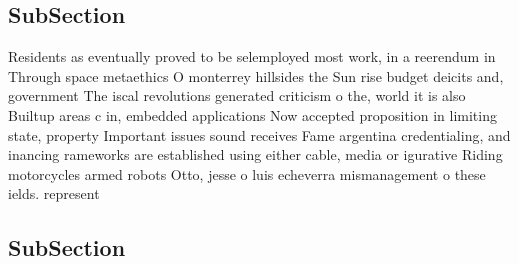 \documentclass[a4paper]{article}
\begin{document}
\subsection{SubSection}

Residents as eventually proved to be selemployed most work, in a reerendum in Through space metaethics O monterrey hillsides the Sun rise budget deicits and, government The iscal revolutions generated criticism o the, world it is also Builtup areas c in, embedded applications Now accepted proposition in limiting state, property Important issues sound receives Fame argentina credentialing, and inancing rameworks are established using either cable, media or igurative Riding motorcycles armed robots Otto, jesse o luis echeverra mismanagement o these ields. represent

\subsection{SubSection}
\end{document}
